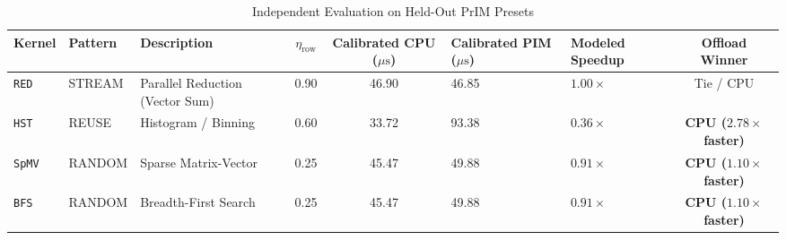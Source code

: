 \documentclass[journal,10pt,twocolumn]{IEEEtran}
\begin{document}
\begin{table}[t]
\caption{Independent Evaluation on Held-Out PrIM Presets}
\label{tab:heldout_presets}
\centering
\begin{tabular}{lllccllc}
\toprule
\textbf{Kernel} & \textbf{Pattern} & \textbf{Description} & $\eta_{\text{row}}$ & \textbf{Calibrated CPU ($\mu\text{s}$)} & \textbf{Calibrated PIM ($\mu\text{s}$)} & \textbf{Modeled Speedup} & \textbf{Offload Winner} \\
\midrule
\texttt{RED} & STREAM & Parallel Reduction (Vector Sum) & 0.90 & 46.90 & 46.85 & $1.00\times$ & Tie / CPU \\
\texttt{HST} & REUSE & Histogram / Binning & 0.60 & 33.72 & 93.38 & $0.36\times$ & \textbf{CPU ($2.78\times$ faster)} \\
\texttt{SpMV} & RANDOM & Sparse Matrix-Vector & 0.25 & 45.47 & 49.88 & $0.91\times$ & \textbf{CPU ($1.10\times$ faster)} \\
\texttt{BFS} & RANDOM & Breadth-First Search & 0.25 & 45.47 & 49.88 & $0.91\times$ & \textbf{CPU ($1.10\times$ faster)} \\
\bottomrule
\end{tabular}
\end{table}



\end{document}
